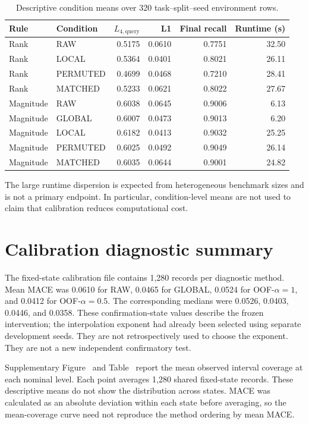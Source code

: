 \documentclass[11pt]{article}
\newcommand{\Lfourq}{\ensuremath{L_{4,\mathrm{query}}}\xspace}
\begin{document}
\begin{table}[ht]
\centering
\caption{Descriptive condition means over 320 task--split--seed environment rows.}
\small
\begin{tabular}{llrrrr}
\toprule
Rule & Condition & \Lfourq & L1 & Final recall & Runtime (s)\\
\midrule
Rank & RAW & 0.5175 & 0.0610 & 0.7751 & 32.50\\
Rank & LOCAL & 0.5364 & 0.0401 & 0.8021 & 26.11\\
Rank & PERMUTED & 0.4699 & 0.0468 & 0.7210 & 28.41\\
Rank & MATCHED & 0.5233 & 0.0621 & 0.8022 & 27.67\\
Magnitude & RAW & 0.6038 & 0.0645 & 0.9006 & 6.13\\
Magnitude & GLOBAL & 0.6007 & 0.0473 & 0.9013 & 6.20\\
Magnitude & LOCAL & 0.6182 & 0.0413 & 0.9032 & 25.25\\
Magnitude & PERMUTED & 0.6025 & 0.0492 & 0.9049 & 26.14\\
Magnitude & MATCHED & 0.6035 & 0.0644 & 0.9001 & 24.82\\
\bottomrule
\end{tabular}
\end{table}

The large runtime dispersion is expected from heterogeneous benchmark sizes and is not a primary endpoint. In particular, condition-level means are not used to claim that calibration reduces computational cost.

\section{Calibration diagnostic summary}
The fixed-state calibration file contains 1,280 records per diagnostic method. Mean MACE was 0.0610 for RAW, 0.0465 for GLOBAL, 0.0524 for OOF-$\alpha=1$, and 0.0412 for OOF-$\alpha=0.5$. The corresponding medians were 0.0526, 0.0403, 0.0446, and 0.0358. These confirmation-state values describe the frozen intervention; the interpolation exponent had already been selected using separate development seeds. They are not retrospectively used to choose the exponent. They are not a new independent confirmatory test.

Supplementary Figure~ and Table~ report the mean observed interval coverage at each nominal level. Each point averages 1,280 shared fixed-state records. These descriptive means do not show the distribution across states. MACE was calculated as an absolute deviation within each state before averaging, so the mean-coverage curve need not reproduce the method ordering by mean MACE.
\end{document}
